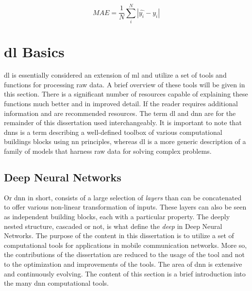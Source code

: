 \begin{equation}
    MAE =  \frac{1}{N} \sum_i^N |\hat{y_i} - y_i|
\end{equation}


\section{\acrlong{dl} Basics}\label{sec:dlbasics}

\gls{dl} is essentially considered an extension of \gls{ml} and utilize a set of tools and functions for processing raw data. A brief overview of these tools will be given in this section. There is a significant number of resources capable of explaining these functions much better and in improved detail. If the reader requires additional information \cite{Nielsen2015} and \cite{Goodfellow-et-al-2016} are recommended resources. The term \gls{dl} and \gls{dnn} are for the remainder of this dissertation used interchangeably. It is important to note that \glspl{dnn} is a term describing a well-defined toolbox of various computational buildings blocks using \gls{nn} principles, whereas \gls{dl} is a more generic description of a family of models that harness raw data for solving complex problems.

\subsection{Deep Neural Networks}
Or \gls{dnn} in short, consists of a large selection of \emph{layers} than can be concatenated to offer various non-linear transformation of inputs. These layers can also be seen as independent building blocks, each with a particular property. The deeply nested structure, cascaded or not, is what define the \emph{deep} in Deep Neural Networks. The purpose of the content in this dissertation is to utilize a set of computational tools for applications in mobile communication networks. More so, the contributions of the dissertation are reduced to the usage of the tool and not to the optimization and improvements of the tools. The area of \gls{dnn} is extensive and continuously evolving. The content of this section is a brief introduction into the many \gls{dnn} computational tools. 


